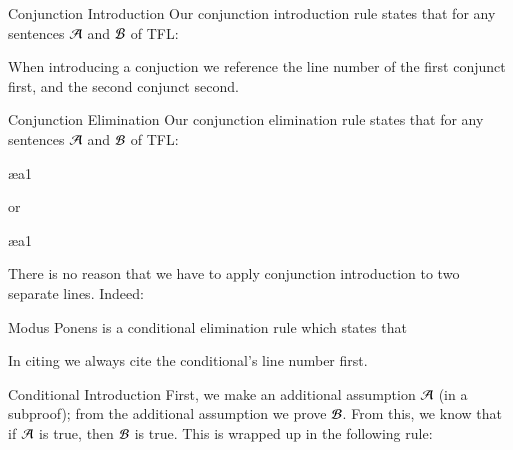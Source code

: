 \documentclass[12pt, a4paper, twoside, openright, titlepage]{book}
\begin{document}
\begin{defn}{Conjunction Introduction}{}
    Our conjunction introduction rule states that for any sentences $\mathcal{A}$ and $\mathcal{B}$ of TFL: \begin{fitchproof}
         
    \end{fitchproof}
    When introducing a conjuction we reference the line number of the first conjunct first, and the second conjunct second.
\end{defn}

\begin{defn}{Conjunction Elimination}{}
    Our conjunction elimination rule states that for any sentences $\mathcal{A}$ and $\mathcal{B}$ of TFL: \begin{fitchproof}
         \ae{a1}
    \end{fitchproof}
    or \begin{fitchproof}
         \ae{a1}
    \end{fitchproof}
\end{defn}


\begin{rmk}{}{}
    There is no reason that we have to apply conjunction introduction to two separate lines. Indeed: \begin{fitchproof}
         
    \end{fitchproof}
\end{rmk}

\begin{defn}{Modus Ponens}{}
     is a conditional elimination rule which states that \begin{fitchproof}
         
    \end{fitchproof}
    In citing we always cite the conditional's line number first.
\end{defn}

\begin{defn}{Conditional Introduction}
    First, we make an additional assumption $\mathcal{A}$ (in a subproof); from the additional assumption we prove $\mathcal{B}$. From this, we know that if $\mathcal{A}$ is true, then $\mathcal{B}$ is true. This is wrapped up in the following rule: \begin{fitchproof}
        \open
                \close
    \end{fitchproof}
\end{defn}
\end{document}
